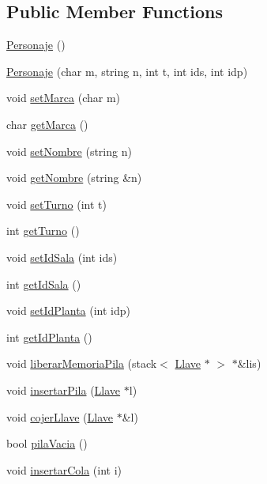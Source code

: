 \subsection*{Public Member Functions}
\begin{CompactItemize}
\item 
\hyperlink{classPersonaje_9238a75aae652b20dd423e85cfa1ee17}{Personaje} ()
\item 
\hyperlink{classPersonaje_a86eafddc218e8afa94f989b3642bcbd}{Personaje} (char m, string n, int t, int ids, int idp)
\item 
void \hyperlink{classPersonaje_475630fe753b7fb80a2472c558d99169}{setMarca} (char m)
\item 
char \hyperlink{classPersonaje_36e1ba57799adb58163bec5a4f0015e0}{getMarca} ()
\item 
void \hyperlink{classPersonaje_2e84ee485f46b434f1d23558ad3eb7c9}{setNombre} (string n)
\item 
void \hyperlink{classPersonaje_801e7fe38d0727d3219e51e916e2ce67}{getNombre} (string \&n)
\item 
void \hyperlink{classPersonaje_de04da7a674a165aeaa09566b219a828}{setTurno} (int t)
\item 
int \hyperlink{classPersonaje_425c743df0309deab48e9575d715eed9}{getTurno} ()
\item 
void \hyperlink{classPersonaje_43a551a88fe3c6d4458719135992114b}{setIdSala} (int ids)
\item 
int \hyperlink{classPersonaje_5266df5bdfa75df5dfc631d94be2993d}{getIdSala} ()
\item 
void \hyperlink{classPersonaje_361e72e69c915f6e0c7d2c5e82ae0744}{setIdPlanta} (int idp)
\item 
int \hyperlink{classPersonaje_f388d329d466b136c60fa26c6c4800a7}{getIdPlanta} ()
\item 
void \hyperlink{classPersonaje_1ad939228d858b75826ddb4effa67ceb}{liberarMemoriaPila} (stack$<$ \hyperlink{classLlave}{Llave} $\ast$ $>$ $\ast$\&lis)
\item 
void \hyperlink{classPersonaje_6ede7d70599342ba61eb034027a41f2a}{insertarPila} (\hyperlink{classLlave}{Llave} $\ast$l)
\item 
void \hyperlink{classPersonaje_8880afa570d1f919516e2810b2226b08}{cojerLlave} (\hyperlink{classLlave}{Llave} $\ast$\&l)
\item 
bool \hyperlink{classPersonaje_27166f7a52fcfb3570e0dc20f37a2402}{pilaVacia} ()
\item 
void \hyperlink{classPersonaje_66ec23478444efc795d29734cc010809}{insertarCola} (int i)

\end{CompactItemize}
